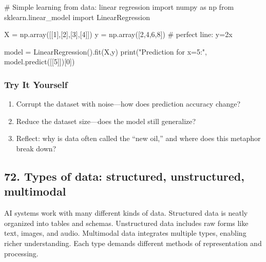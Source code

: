 \documentclass[
  letterpaper,
  DIV=11,
  numbers=noendperiod]{scrreprt}
\newenvironment{Shaded}{\begin{snugshade}}{\end{snugshade}}
\newcommand{\BuiltInTok}[1]{\textcolor[rgb]{0.00,0.23,0.31}{#1}}
\newcommand{\CommentTok}[1]{\textcolor[rgb]{0.37,0.37,0.37}{#1}}
\newcommand{\DecValTok}[1]{\textcolor[rgb]{0.68,0.00,0.00}{#1}}
\newcommand{\ImportTok}[1]{\textcolor[rgb]{0.00,0.46,0.62}{#1}}
\newcommand{\NormalTok}[1]{\textcolor[rgb]{0.00,0.23,0.31}{#1}}
\newcommand{\OperatorTok}[1]{\textcolor[rgb]{0.37,0.37,0.37}{#1}}
\newcommand{\StringTok}[1]{\textcolor[rgb]{0.13,0.47,0.30}{#1}}
\providecommand{\tightlist}{%
  \setlength{\itemsep}{0pt}\setlength{\parskip}{0pt}}
\begin{document}
\begin{Shaded}
\begin{Highlighting}[]
\CommentTok{\# Simple learning from data: linear regression}
\ImportTok{import}\NormalTok{ numpy }\ImportTok{as}\NormalTok{ np}
\ImportTok{from}\NormalTok{ sklearn.linear\_model }\ImportTok{import}\NormalTok{ LinearRegression}

\NormalTok{X }\OperatorTok{=}\NormalTok{ np.array([[}\DecValTok{1}\NormalTok{],[}\DecValTok{2}\NormalTok{],[}\DecValTok{3}\NormalTok{],[}\DecValTok{4}\NormalTok{]])}
\NormalTok{y }\OperatorTok{=}\NormalTok{ np.array([}\DecValTok{2}\NormalTok{,}\DecValTok{4}\NormalTok{,}\DecValTok{6}\NormalTok{,}\DecValTok{8}\NormalTok{])  }\CommentTok{\# perfect line: y=2x}

\NormalTok{model }\OperatorTok{=}\NormalTok{ LinearRegression().fit(X,y)}
\BuiltInTok{print}\NormalTok{(}\StringTok{"Prediction for x=5:"}\NormalTok{, model.predict([[}\DecValTok{5}\NormalTok{]])[}\DecValTok{0}\NormalTok{])}
\end{Highlighting}
\end{Shaded}

\subsubsection{Try It Yourself}\label{try-it-yourself-70}

\begin{enumerate}
\def\labelenumi{\arabic{enumi}.}
\tightlist
\item
  Corrupt the dataset with noise---how does prediction accuracy change?
\item
  Reduce the dataset size---does the model still generalize?
\item
  Reflect: why is data often called the ``new oil,'' and where does this
  metaphor break down?
\end{enumerate}

\subsection{72. Types of data: structured, unstructured,
multimodal}\label{types-of-data-structured-unstructured-multimodal}

AI systems work with many different kinds of data. Structured data is
neatly organized into tables and schemas. Unstructured data includes raw
forms like text, images, and audio. Multimodal data integrates multiple
types, enabling richer understanding. Each type demands different
methods of representation and processing.
\end{document}
